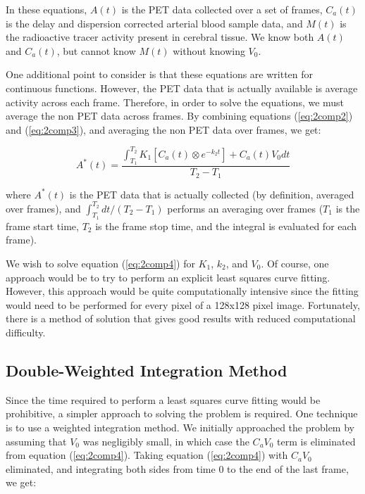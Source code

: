 In these equations, $A(t)$ is the PET data collected over a set of
frames, $C_{a}(t)$ is the delay and dispersion corrected arterial
blood sample data, and $M(t)$ is the radioactive tracer activity
present in cerebral tissue.  We know both $A(t)$ and $C_{a}(t)$, but
cannot know $M(t)$ without knowing $V_{0}$.

One additional point to consider is that these equations are written
for continuous functions.  However, the PET data that is actually
available is average activity across each frame.  Therefore, in
order to solve the equations, we must average the non PET data
across frames.  By combining equations (\ref{eq:2comp2}) and
(\ref{eq:2comp3}), and averaging the non PET data over frames, we
get:

\begin{equation}
A^{*}(t) = \frac{\int_{T_1}^{T_2} K_{1} \left[ C_{a}(t) \otimes
e^{-k_{2}t} \right] + C_{a}(t)V_{0} dt}{T_{2} - T_{1}}
\label{eq:2comp4}
\end{equation}

where $A^{*}(t)$ is the PET data that is actually collected (by
definition, averaged over frames), and ${\int_{T_1}^{T_2}dt} / {(T_2 -
T_1)}$ performs an averaging over frames ($T_1$ is the frame start
time, $T_2$ is the frame stop time, and the integral is evaluated for
each frame).

We wish to solve equation (\ref{eq:2comp4}) for $K_{1}$, $k_{2}$, and
$V_{0}$.  Of course, one approach would be to try to perform an
explicit least squares curve fitting.  However, this approach would be
quite computationally intensive since the fitting would need to be
performed for every pixel of a 128x128 pixel image.  Fortunately,
there is a method of solution that gives good results with reduced
computational difficulty.

\subsection{Double-Weighted Integration Method}

\label{sec:double_weight}

Since the time required to perform a least squares curve fitting would
be prohibitive, a simpler approach to solving the problem is required.
One technique is to use a weighted integration method.  We initially
approached the problem by assuming that $V_{0}$ was negligibly small,
in which case the $C_{a}V_{0}$ term is eliminated from equation
(\ref{eq:2comp4}).  Taking equation (\ref{eq:2comp4}) with $C_{a}V_0$
eliminated, and integrating both sides from time 0 to the end of the
last frame, we get:

